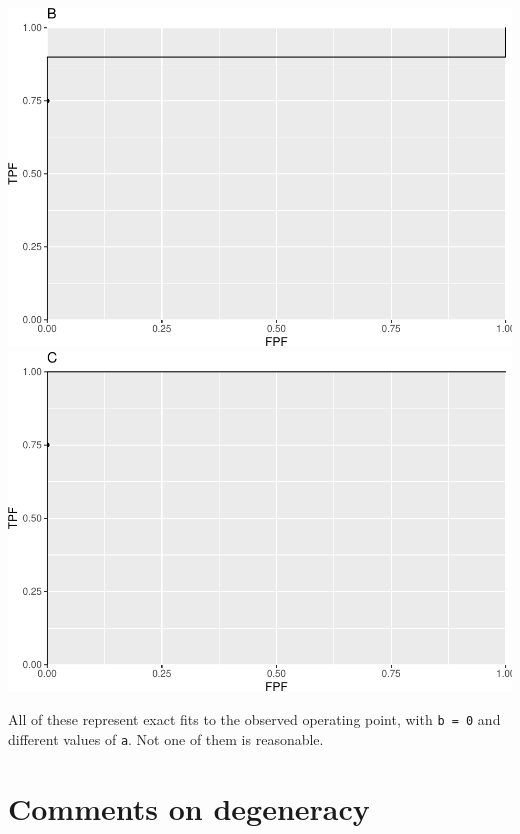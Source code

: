 \documentclass[]{book}
\begin{document}
\includegraphics{22-DegenerateROCs_files/figure-latex/unnamed-chunk-3-1.pdf} \includegraphics{22-DegenerateROCs_files/figure-latex/unnamed-chunk-3-2.pdf}

All of these represent exact fits to the observed operating point, with \texttt{b\ =\ 0} and different values of \texttt{a}. Not one of them is reasonable.

\hypertarget{comments-on-degeneracy}{%
\section{Comments on degeneracy}\label{comments-on-degeneracy}}
\end{document}
